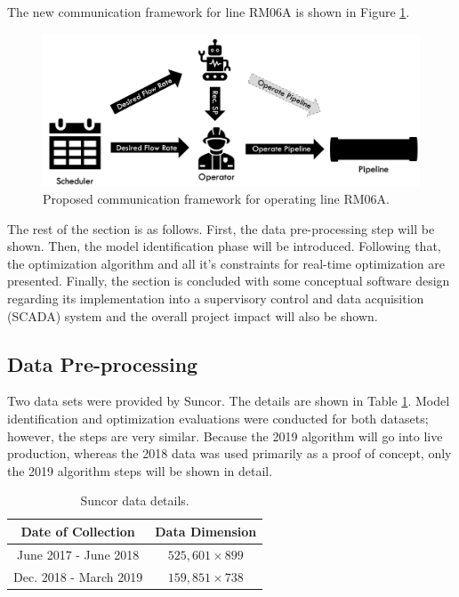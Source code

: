 The new communication framework for line RM06A is shown in Figure \ref{fig:08scheduleV2}.

\begin{figure}[h]
    \centering
    \includegraphics[scale=0.35]{images/08ScheduleV2.png}
    \caption{Proposed communication framework for operating line RM06A.}
    \label{fig:08scheduleV2}
\end{figure}

The rest of the section is as follows.  First, the data pre-processing step will be shown.  Then, the model identification phase will be introduced.  Following that, the optimization algorithm and all it's constraints for real-time optimization are presented.  Finally, the section is concluded with some conceptual software design regarding its implementation into a supervisory control and data acquisition (SCADA) system and the overall project impact will also be shown.

\subsection{Data Pre-processing}
Two data sets were provided by Suncor.  The details are shown in Table \ref{tab:08data}. Model identification and optimization evaluations were conducted for both datasets; however, the steps are very similar.  Because the 2019 algorithm will go into live production, whereas the 2018 data was used primarily as a proof of concept, only the 2019 algorithm steps will be shown in detail.

\begin{table}[h]
    \centering
    {
    \begin{tabular}{ c | c }
        Date of Collection     &      Data Dimension      \\
        \hline
        June 2017 - June 2018  &    $525,601 \times 899$   \\
        Dec. 2018 - March 2019 &    $159,851 \times 738$   \\
    \end{tabular}}
    \caption{Suncor data details.}
    \label{tab:08data}
\end{table}

